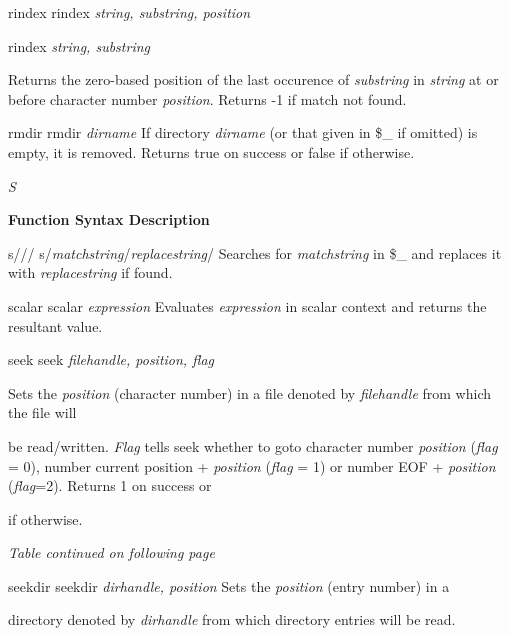 \documentclass[a4paper,11pt]{book}
\begin{document}
\noindent rindex rindex \textit{string, substring, position}

\noindent 

\noindent rindex \textit{string, substring}

\noindent 

\noindent Returns the zero-based position of the last occurence of \textit{substring }in \textit{string }at or before character number \textit{position}. Returns -1 if match not found.

\noindent rmdir rmdir \textit{dirname }If directory \textit{dirname }(or that given in \$\_ if omitted) is empty, it is removed. Returns true on success or false if otherwise.

\noindent 

\noindent \textit{S}

\noindent 

\noindent \textbf{Function Syntax Description}

\noindent 

\noindent s/// s/\textit{matchstring}/\textit{replacestring}/ Searches for \textit{matchstring }in \$\_ and replaces it with \textit{replacestring }if found.

\noindent scalar scalar \textit{expression }Evaluates \textit{expression }in scalar context and returns the resultant value.

\noindent seek seek \textit{filehandle, position, flag}

\noindent 

\noindent Sets the \textit{position }(character number) in a file denoted by \textit{filehandle }from which the file will

\noindent be read/written. \textit{Flag }tells seek whether to goto character number \textit{position }(\textit{flag }= 0), number current position + \textit{position }(\textit{flag }= 1) or number EOF + \textit{position }(\textit{flag}=2). Returns 1 on success or

 if otherwise.

\noindent \textit{Table continued on following page}

     

\noindent  

\noindent 

\noindent seekdir seekdir \textit{dirhandle, position }Sets the \textit{position }(entry number) in a

\noindent directory denoted by \textit{dirhandle }from which directory entries will be read.
\end{document}
